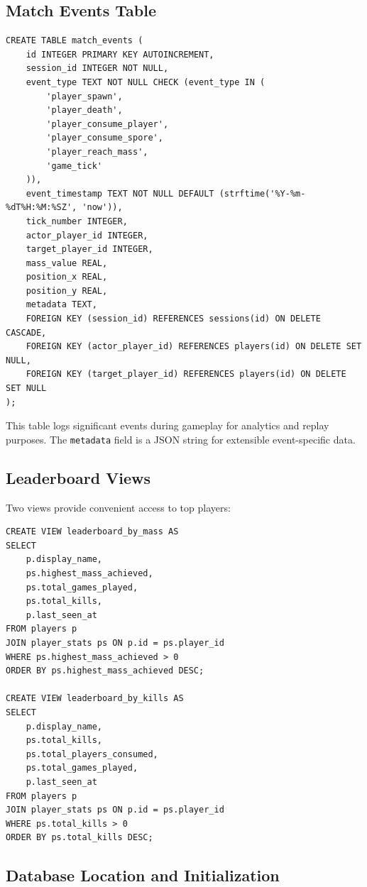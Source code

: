 \documentclass[11pt]{article}
\begin{document}
\subsection{Match Events Table}

\begin{verbatim}
CREATE TABLE match_events (
    id INTEGER PRIMARY KEY AUTOINCREMENT,
    session_id INTEGER NOT NULL,
    event_type TEXT NOT NULL CHECK (event_type IN (
        'player_spawn',
        'player_death',
        'player_consume_player',
        'player_consume_spore',
        'player_reach_mass',
        'game_tick'
    )),
    event_timestamp TEXT NOT NULL DEFAULT (strftime('%Y-%m-%dT%H:%M:%SZ', 'now')),
    tick_number INTEGER,
    actor_player_id INTEGER,
    target_player_id INTEGER,
    mass_value REAL,
    position_x REAL,
    position_y REAL,
    metadata TEXT,
    FOREIGN KEY (session_id) REFERENCES sessions(id) ON DELETE CASCADE,
    FOREIGN KEY (actor_player_id) REFERENCES players(id) ON DELETE SET NULL,
    FOREIGN KEY (target_player_id) REFERENCES players(id) ON DELETE SET NULL
);
\end{verbatim}

This table logs significant events during gameplay for analytics and replay purposes. The \texttt{metadata} field is a JSON string for extensible event-specific data.

\subsection{Leaderboard Views}

Two views provide convenient access to top players:

\begin{verbatim}
CREATE VIEW leaderboard_by_mass AS
SELECT 
    p.display_name,
    ps.highest_mass_achieved,
    ps.total_games_played,
    ps.total_kills,
    p.last_seen_at
FROM players p
JOIN player_stats ps ON p.id = ps.player_id
WHERE ps.highest_mass_achieved > 0
ORDER BY ps.highest_mass_achieved DESC;

CREATE VIEW leaderboard_by_kills AS
SELECT 
    p.display_name,
    ps.total_kills,
    ps.total_players_consumed,
    ps.total_games_played,
    p.last_seen_at
FROM players p
JOIN player_stats ps ON p.id = ps.player_id
WHERE ps.total_kills > 0
ORDER BY ps.total_kills DESC;
\end{verbatim}

\subsection{Database Location and Initialization}
\end{document}
